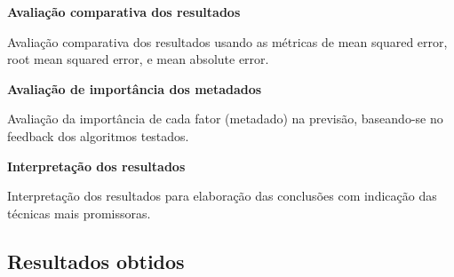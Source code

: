             \textbf{Avaliação comparativa dos resultados}\par
            Avaliação comparativa dos resultados usando as métricas de mean squared error, root mean squared error, e mean absolute error.\newline
    
            \textbf{Avaliação de importância dos metadados}\par
            Avaliação da importância de cada fator (metadado) na previsão, baseando-se no feedback dos algoritmos testados.\newline
    
            \textbf{Interpretação dos resultados}\par
            Interpretação dos resultados para elaboração das conclusões com indicação das técnicas mais promissoras.\newline

        \subsection{Resultados obtidos}

